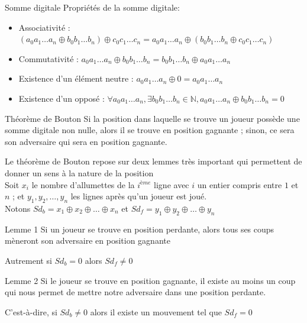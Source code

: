 \documentclass[ aspectratio=169]{beamer}
\begin{document}
		\begin{frame}{Somme digitale}
		Propriétés de la somme digitale:
		\begin{itemize}
		\item Associativité :
		$
		( a_{0}a_{1}\dots a_{n} \oplus b_{0}b_{1}\dots b_{n})\oplus c_{0}c_{1}\dots c_{n} = a_{0}a_{1}\dots a_{n} \oplus (b_{0}b_{1}\dots b_{n}\oplus c_{0}c_{1}\dots c_{n})
		$
		\item Commutativité : 
		$
		a_{0}a_{1}\dots a_{n} \oplus b_{0}b_{1}\dots b_{n}=b_{0}b_{1}\dots b_{n} \oplus a_{0}a_{1}\dots a_{n}
		$
		\item Existence d'un élément neutre : $a_{0}a_{1}\dots a_{n} \oplus 0 = a_{0}a_{1}\dots a_{n}$
		\item Existence d'un opposé :
		$
		\forall a_{0}a_{1}\dots a_{n}, \exists b_{0}b_{1}\dots b_{n} \in \mathbb{N}, a_{0}a_{1}\dots a_{n} \oplus b_{0}b_{1}\dots b_{n}=0
		$
		\end{itemize}
		\end{frame}
		
		\begin{frame}
		\begin{block}{Théorème de Bouton}
		Si la position dans laquelle se trouve un joueur possède une somme digitale non nulle, alors il se trouve en position gagnante ; sinon, ce sera son adversaire qui sera en position gagnante.
		\end{block}
		 
		 
		\end{frame}
		
		\begin{frame}
		Le théorème de Bouton repose sur deux lemmes très important qui permettent de donner un sens à la nature de la position\\
		Soit $x_{i}$ le nombre d'allumettes de la $i^{ème}$ ligne avec $i$ un entier compris entre $1$ et $n$ ; et $y_{1}, y_{2},\dots, y_{n}$ les lignes après qu'un joueur est joué.\\
		 Notons $Sd_{b} = x_{1} \oplus x_{2}\oplus \dots \oplus x_{n}$ et $Sd_{f} = y_{1} \oplus y_{2}\oplus \dots \oplus y_{n}$
		 \end{frame}
		 
		\begin{frame}
		\begin{exampleblock}{Lemme 1}
		Si un joueur se trouve en position perdante, alors tous ses coups mèneront son adversaire en position gagnante
		\end{exampleblock}
		Autrement si $Sd_{b}= 0$ alors $Sd_{f} \neq 0$
		\begin{exampleblock}{Lemme 2}
		Si le joueur se trouve en position gagnante, il existe au moins un coup qui nous permet de mettre notre adversaire dans une position perdante.
		\end{exampleblock}
		C'est-à-dire, si $Sd_{b} \neq 0$ alors il existe  un mouvement tel que $Sd_{f}= 0$
		\end{frame}
\end{document}
